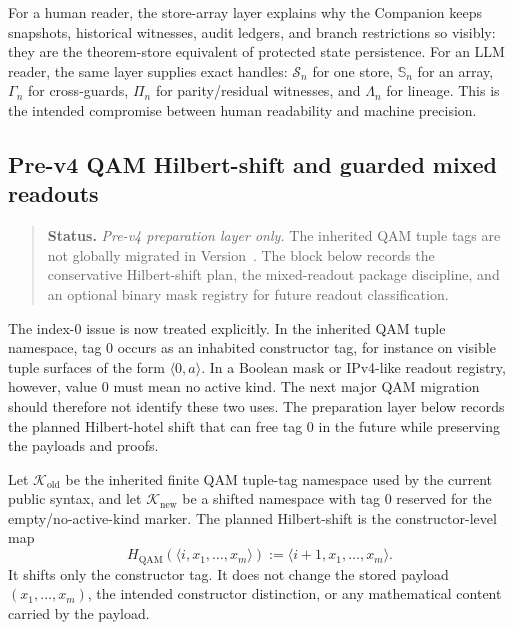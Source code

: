 \begin{remark}\label{rem:sphaera-array-human-llm-gain}
For a human reader, the store-array layer explains why the Companion keeps snapshots, historical witnesses, audit ledgers, and branch restrictions so visibly: they are the theorem-store equivalent of protected state persistence. For an LLM reader, the same layer supplies exact handles: \(\mathcal S_n\) for one store, \(\mathbb S_n\) for an array, \(\Gamma_n\) for cross-guards, \(\Pi_n\) for parity/residual witnesses, and \(\Lambda_n\) for lineage. This is the intended compromise between human readability and machine precision.
\end{remark}


\subsection*{Pre-v4 QAM Hilbert-shift and guarded mixed readouts}
\begin{quote}\small
\noindent\textbf{Status.} \emph{Pre-v4 preparation layer only.} The inherited QAM tuple tags are not globally migrated in Version~\docversion{}. The block below records the conservative Hilbert-shift plan, the mixed-readout package discipline, and an optional binary mask registry for future readout classification.
\end{quote}

The index-0 issue is now treated explicitly. In the inherited QAM tuple namespace, tag 0 occurs as an inhabited constructor tag, for instance on visible tuple surfaces of the form $\langle 0,a\rangle$. In a Boolean mask or IPv4-like readout registry, however, value 0 must mean no active kind. The next major QAM migration should therefore not identify these two uses. The preparation layer below records the planned Hilbert-hotel shift that can free tag 0 in the future while preserving the payloads and proofs.

\begin{definition}\label{def:qam-hilbert-shift-plan}
Let $\mathcal K_{\mathrm{old}}$ be the inherited finite QAM tuple-tag namespace used by the current public syntax, and let $\mathcal K_{\mathrm{new}}$ be a shifted namespace with tag 0 reserved for the empty/no-active-kind marker. The planned Hilbert-shift is the constructor-level map
\[
  H_{\mathrm{QAM}}(\langle i,x_1,\ldots,x_m\rangle)
  :=
  \langle i+1,x_1,\ldots,x_m\rangle.
\]
It shifts only the constructor tag. It does not change the stored payload $(x_1,\ldots,x_m)$, the intended constructor distinction, or any mathematical content carried by the payload.
\end{definition}

